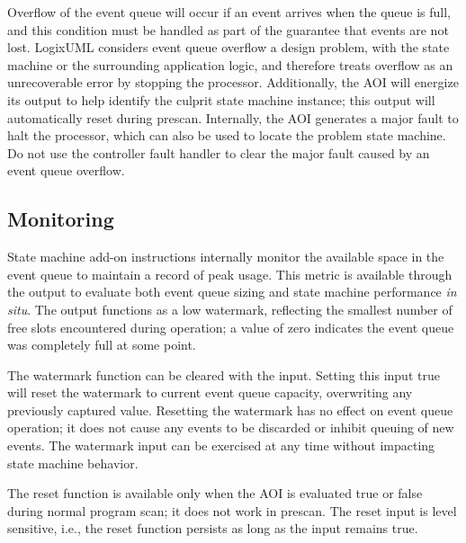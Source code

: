Overflow of the event queue will occur if an event arrives when the queue
is full, and this condition must be handled as part of the guarantee that
events are not lost.
LogixUML considers event queue overflow a design problem,
with the state machine or the surrounding application logic, and
therefore treats overflow as an unrecoverable error by stopping the processor.
Additionally, the AOI will energize its 
output to help identify the culprit state machine instance; this output
will automatically reset during prescan. Internally, the AOI generates
a major fault to halt the processor, which can also be used to locate the
problem state machine. Do not use the controller fault handler
to clear the major fault caused by an event queue overflow.


\subsection{Monitoring}

State machine add-on instructions internally monitor the available space in
the event queue to maintain a record of peak usage. This metric is
available through the  output
to evaluate both event queue sizing and state machine performance
\emph{in situ}. The output functions as a low
watermark, reflecting the smallest number of free slots encountered during
operation; a value of zero indicates the event queue was completely
full at some point.

The watermark function can be cleared with the
 input. Setting this input true will
reset the watermark to current event queue capacity, overwriting any
previously captured value. Resetting the watermark has no effect on event
queue operation; it does not cause any events to be discarded or inhibit
queuing of new events. The watermark input can be exercised at any
time without impacting state machine behavior.

The reset function is available only when the
AOI is evaluated true or false during normal program scan; it does not
work in prescan. The reset input is level sensitive, i.e., the reset
function persists as long as the input remains true.
